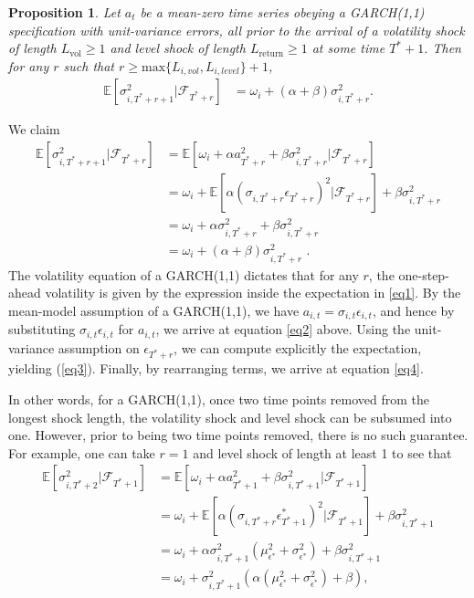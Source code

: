 \documentclass[11pt,3p,review,authoryear]{elsarticle}
\newtheorem{prop}{Proposition}
\theoremstyle{definition}
\newenvironment{proof-of-proposition}[1][{}]{\noindent{\bf
    Proof of Proposition {#1}}
  \hspace*{.5em}}{\qed\bigskip\\}
\begin{document}
\begin{prop}
Let $a_{t}$ be a mean-zero time series obeying a GARCH(1,1) specification with unit-variance errors, all prior to the arrival of a volatility shock of length $L_{\text{vol}} \geq 1$ and level shock of length $L_{\text{return}}\geq 1$ at some time $T^{*}+1$.  Then for any $r$ such that $r \geq \text{max}\{L_{i, vol},L_{i, level}\} + 1$, 
\begin{align*}
\mathbb{E}[ \sigma^{2}_{i,T^{*}+r+1} |\mathcal{F}_{T^{*}+r}] & = \omega_{i} + (\alpha + \beta)\sigma^{2}_{i,T^{*}+r}.
\end{align*}
\end{prop}

\begin{proof-of-proposition}
We claim
\begin{align}
\mathbb{E}[ \sigma^{2}_{i,T^{*}+r+1} |\mathcal{F}_{T^{*}+r}] & = \mathbb{E}[\omega_{i} + \alpha a_{T^{*}+r}^{2} + \beta\sigma^{2}_{i,T^{*}+r} |\mathcal{F}_{T^{*}+r}] \label{eq1}\\
& = \omega_{i} + \mathbb{E}[\alpha(\sigma_{i,T^{*}+r}\epsilon_{T^{*}+r})^{2} |\mathcal{F}_{T^{*}+r}] + \beta\sigma^{2}_{i,T^{*}+r} \label{eq2}\\
& = \omega_{i} + \alpha\sigma_{i,T^{*}+r}^{2} + \beta\sigma^{2}_{i,T^{*}+r} \label{eq3}\\
& = \omega_{i} + (\alpha + \beta) \sigma^{2}_{i,T^{*}+r}\label{eq4} \text{ .}
\end{align}
The volatility equation of a GARCH(1,1) dictates that for any $r$, the one-step-ahead volatility is given by the expression inside the expectation in \eqref{eq1}.  By the mean-model assumption of a GARCH(1,1), we have $a_{i,t} = \sigma_{i,t}\epsilon_{i,t}$, and hence by substituting $\sigma_{i,t}\epsilon_{i,t}$ for $a_{i,t}$, we arrive at equation \eqref{eq2} above.  Using the unit-variance assumption on $\epsilon_{T^{*}+r}$, we can compute explicitly the expectation, yielding (\ref{eq3}).  Finally, by rearranging terms, we arrive at equation \eqref{eq4}.
\end{proof-of-proposition}
In other words, for a GARCH(1,1), once two time points removed from the longest shock length, the volatility shock and level shock can be subsumed into one.  However, prior to being two time points removed, there is no such guarantee.  For example, one can take $r = 1$ and level shock of length at least 1 to see that 
\begin{align*}
\mathbb{E}[ \sigma^{2}_{i,T^{*}+2} |\mathcal{F}_{T^{*}+1}] & = \mathbb{E}[\omega_{i} + \alpha a_{T^{*}+1}^{2} + \beta\sigma^{2}_{i,T^{*}+1} |\mathcal{F}_{T^{*}+1}] \\
& = \omega_{i} + \mathbb{E}[\alpha(\sigma_{i,T^{*}+r}\epsilon^{*}_{T^{*}+1})^{2} |\mathcal{F}_{T^{*}+1}] + \beta\sigma^{2}_{i,T^{*}+1} \\
& = \omega_{i} + \alpha\sigma^{2}_{i,T^{*}+1}(\mu^{2}_{\epsilon^{*}} + \sigma^{2}_{\epsilon^{*}}) + \beta\sigma^{2}_{i,T^{*}+1} \\
& = \omega_{i} + \sigma^{2}_{i,T^{*}+1}(\alpha(\mu^{2}_{\epsilon^{*}} + \sigma^{2}_{\epsilon^{*}}) + \beta)\text{,}
\end{align*}
\end{document}
